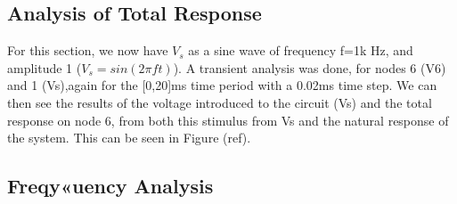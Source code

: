\subsection{Analysis of Total Response}
For this section, we now have $V_s$ as a sine wave of frequency f=1k Hz, and amplitude 1 ($V_s=sin(2\pi f t)$). A transient analysis was done, for nodes 6 (V6) and 1 (Vs),again for the [0,20]ms time period with a 0.02ms time step. We can then see the results of the voltage introduced to the circuit (Vs) and the total response on node 6, from both this stimulus from Vs and the natural response of the system. This can be seen in Figure (ref).
\subsection{Freqy«uency Analysis}

